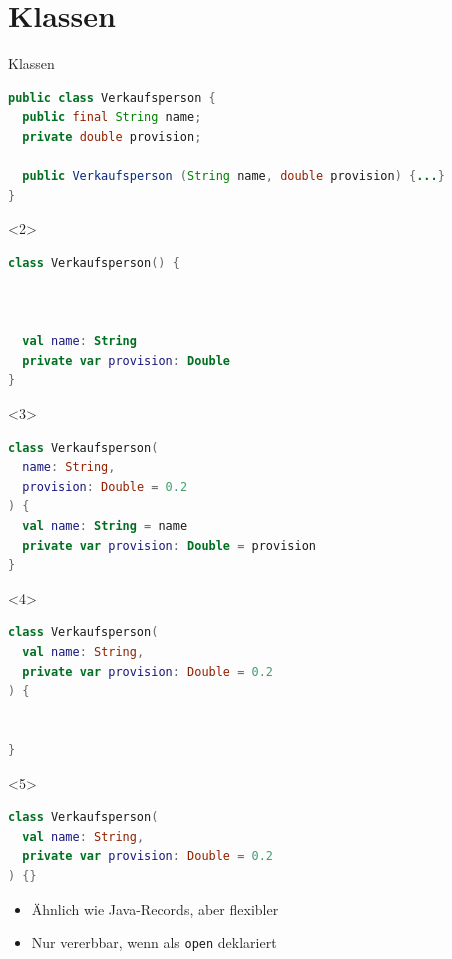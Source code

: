 \documentclass{beamer}
\begin{document}
\section{Klassen}
\begin{frame}[fragile]{Klassen}
  \vspace{-0.25cm}
  \begin{lstlisting}[language=Java, title=Java, xleftmargin=1em]
public class Verkaufsperson {
  public final String name;
  private double provision;

  public Verkaufsperson (String name, double provision) {...}
}
  \end{lstlisting}
  \vspace{-0.25cm}
  \begin{onlyenv}<2>
    \begin{lstlisting}[language=Kotlin, title=Kotlin, xleftmargin=1em]
class Verkaufsperson() {



  val name: String
  private var provision: Double
}
    \end{lstlisting} 
  \end{onlyenv}
  \begin{onlyenv}<3>
    \begin{lstlisting}[language=Kotlin, title=Kotlin, xleftmargin=1em]
class Verkaufsperson(
  name: String,
  provision: Double = 0.2
) {
  val name: String = name
  private var provision: Double = provision
}
    \end{lstlisting} 
  \end{onlyenv}
  \begin{onlyenv}<4>
    \begin{lstlisting}[language=Kotlin, title=Kotlin, xleftmargin=1em]
class Verkaufsperson(
  val name: String,
  private var provision: Double = 0.2
) {


}
    \end{lstlisting} 
  \end{onlyenv}
  \begin{onlyenv}<5>
    \begin{lstlisting}[language=Kotlin, title=Kotlin, xleftmargin=1em]
class Verkaufsperson(
  val name: String,
  private var provision: Double = 0.2
) {}
    \end{lstlisting} 
    \begin{itemize}
      \item Ähnlich wie Java-Records, aber flexibler
      \item Nur vererbbar, wenn als \texttt{open} deklariert
    \end{itemize}
  \end{onlyenv}
\end{frame}
\end{document}
